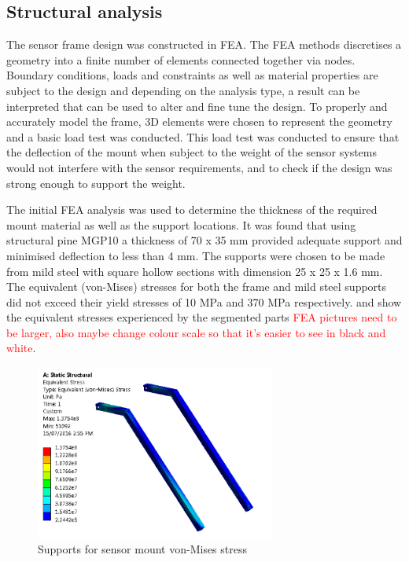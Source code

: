 \documentclass[main.tex]{subfiles}
\begin{document}
\subsection{Structural analysis}
The sensor frame design was constructed in FEA. The FEA methods discretises a geometry into a finite number of elements connected together via nodes. Boundary conditions, loads and constraints as well as material properties are subject to the design and depending on the analysis type, a result can be interpreted that can be used to alter and fine tune the design.  To properly and accurately model the frame, 3D elements were chosen to represent the geometry and a basic load test was conducted. This load test was conducted to ensure that the deflection of the mount when subject to the weight of the sensor systems would not interfere with the sensor requirements, and to check if the design was strong enough to support the weight.

The initial FEA analysis was used to determine the thickness of the required mount material as well as the support locations. It was found that using structural pine MGP10 a thickness of 70 x 35 mm provided adequate support and minimised deflection to less than 4 mm. The supports were chosen to be made from mild steel with square hollow sections with dimension 25 x 25 x 1.6 mm. The equivalent (von-Mises) stresses for both the frame and mild steel supports did not exceed their yield stresses of 10 MPa and 370 MPa respectively.  and  show the equivalent stresses experienced by the segmented parts \textcolor{red}{FEA pictures need to be larger, also maybe change colour scale so that it's easier to see in black and white}. 

\begin{figure}[ht]
\includegraphics[width=0.7\textwidth]{4-DetailedDesign/top_frame.PNG}
\centering
\caption{Supports for sensor mount von-Mises stress} 
\end{figure}
\end{document}
